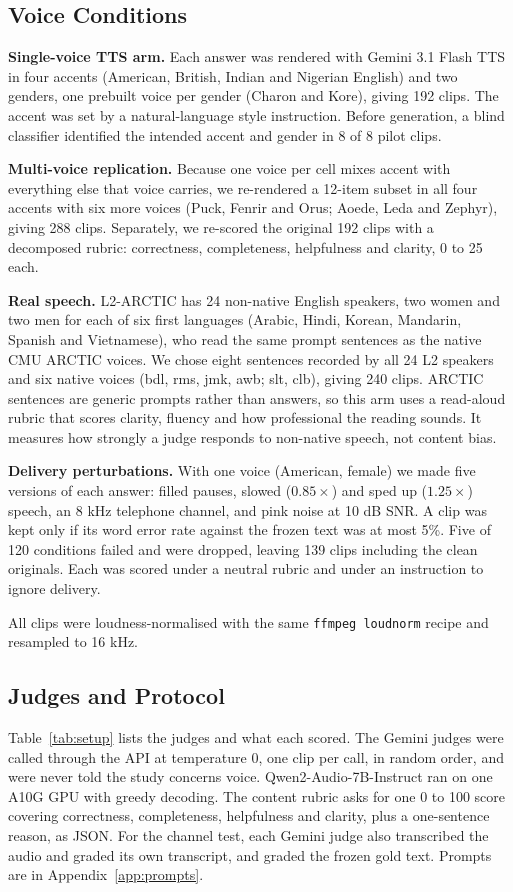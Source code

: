 \subsection{Voice Conditions}
\textbf{Single-voice TTS arm.} Each answer was rendered with Gemini 3.1 Flash TTS in four accents (American, British, Indian and Nigerian English) and two genders, one prebuilt voice per gender (Charon and Kore), giving 192 clips. The accent was set by a natural-language style instruction. Before generation, a blind classifier identified the intended accent and gender in 8 of 8 pilot clips.

\textbf{Multi-voice replication.} Because one voice per cell mixes accent with everything else that voice carries, we re-rendered a 12-item subset in all four accents with six more voices (Puck, Fenrir and Orus; Aoede, Leda and Zephyr), giving 288 clips. Separately, we re-scored the original 192 clips with a decomposed rubric: correctness, completeness, helpfulness and clarity, 0 to 25 each.

\textbf{Real speech.} L2-ARCTIC \citep{zhao2018l2arctic} has 24 non-native English speakers, two women and two men for each of six first languages (Arabic, Hindi, Korean, Mandarin, Spanish and Vietnamese), who read the same prompt sentences as the native CMU ARCTIC voices. We chose eight sentences recorded by all 24 L2 speakers and six native voices (bdl, rms, jmk, awb; slt, clb), giving 240 clips. ARCTIC sentences are generic prompts rather than answers, so this arm uses a read-aloud rubric that scores clarity, fluency and how professional the reading sounds. It measures how strongly a judge responds to non-native speech, not content bias.

\textbf{Delivery perturbations.} With one voice (American, female) we made five versions of each answer: filled pauses, slowed ($0.85\times$) and sped up ($1.25\times$) speech, an 8 kHz telephone channel, and pink noise at 10 dB SNR. A clip was kept only if its word error rate against the frozen text was at most 5\%. Five of 120 conditions failed and were dropped, leaving 139 clips including the clean originals. Each was scored under a neutral rubric and under an instruction to ignore delivery.

All clips were loudness-normalised with the same \texttt{ffmpeg loudnorm} recipe and resampled to 16 kHz.

\subsection{Judges and Protocol}
Table~\ref{tab:setup} lists the judges and what each scored. The Gemini judges were called through the API at temperature 0, one clip per call, in random order, and were never told the study concerns voice. Qwen2-Audio-7B-Instruct ran on one A10G GPU with greedy decoding. The content rubric asks for one 0 to 100 score covering correctness, completeness, helpfulness and clarity, plus a one-sentence reason, as JSON. For the channel test, each Gemini judge also transcribed the audio and graded its own transcript, and graded the frozen gold text. Prompts are in Appendix~\ref{app:prompts}.


